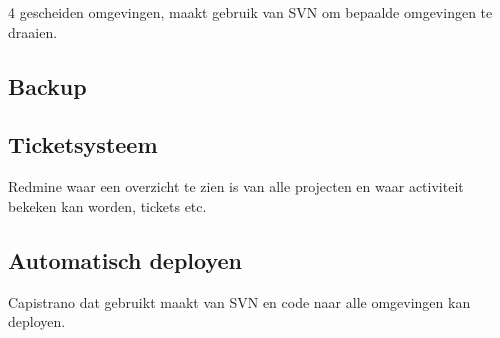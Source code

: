 4 gescheiden omgevingen, maakt gebruik van SVN om bepaalde omgevingen te draaien.

\subsection{Backup}



\subsection{Ticketsysteem}

Redmine waar een overzicht te zien is van alle projecten en waar activiteit bekeken kan worden, tickets etc.

\subsection{Automatisch deployen}

Capistrano dat gebruikt maakt van SVN en code naar alle omgevingen kan deployen.
